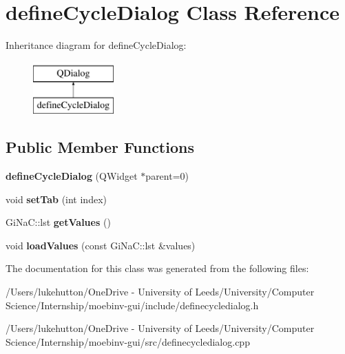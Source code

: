 \hypertarget{classdefine_cycle_dialog}{}\section{define\+Cycle\+Dialog Class Reference}
\label{classdefine_cycle_dialog}
Inheritance diagram for define\+Cycle\+Dialog\+:\begin{figure}[H]
\begin{center}
\leavevmode
\includegraphics[height=2.000000cm]{classdefine_cycle_dialog}
\end{center}
\end{figure}
\subsection*{Public Member Functions}
\begin{DoxyCompactItemize}
\item 
\mbox{\label{classdefine_cycle_dialog_a6f67cfc93b51c9407286019f5f005a22}} 
{\bfseries define\+Cycle\+Dialog} (Q\+Widget $\ast$parent=0)
\item 
\mbox{\label{classdefine_cycle_dialog_a1839a7fbd4d70faf3f7dbd281ab5d52b}} 
void {\bfseries set\+Tab} (int index)
\item 
\mbox{\label{classdefine_cycle_dialog_aafd97025d92beedcac5c626aab88a6af}} 
Gi\+Na\+C\+::lst {\bfseries get\+Values} ()
\item 
\mbox{\label{classdefine_cycle_dialog_a1725401652da06b5fbc0eef513e2b1d1}} 
void {\bfseries load\+Values} (const Gi\+Na\+C\+::lst \&values)
\end{DoxyCompactItemize}


The documentation for this class was generated from the following files\+:\begin{DoxyCompactItemize}
\item 
/\+Users/lukehutton/\+One\+Drive -\/ University of Leeds/\+University/\+Computer Science/\+Internship/moebinv-\/gui/include/definecycledialog.\+h\item 
/\+Users/lukehutton/\+One\+Drive -\/ University of Leeds/\+University/\+Computer Science/\+Internship/moebinv-\/gui/src/definecycledialog.\+cpp\end{DoxyCompactItemize}

